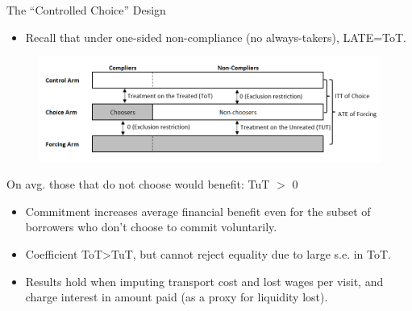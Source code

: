 \documentclass[8pt]{beamer}
\begin{document}
\begin{frame}{The ``Controlled Choice'' Design}
\label{cc_design}
\begin{itemize}
    \item Recall that under one-sided non-compliance (no always-takers), LATE=ToT.
\end{itemize}
\vspace{.2in}
\begin{figure}[H]
    \begin{center}
        \centering
        \includegraphics[width=1.0\textwidth]{Figuras/tot_tut_intuition.png}
    \end{center}
\end{figure}   
 \vfill
\end{frame}




\begin{frame}{On avg. those that do not choose would benefit: TuT $>$ 0}
\begin{itemize}
    \vfill \item Commitment increases average financial benefit even for the subset of borrowers who \alert{don't choose to commit voluntarily}.
    \vfill \item Coefficient ToT>TuT, but cannot reject equality due to large s.e. in ToT.
    \vfill \item Results hold when imputing transport cost and lost wages per visit, and charge interest in amount paid (as a proxy for liquidity lost).
\end{itemize}
\vspace{.2in}
\begin{table}[H]
\label{tot_tut}
\begin{center}
\small{}
\end{center}
\end{table}
\end{frame}
\end{document}

